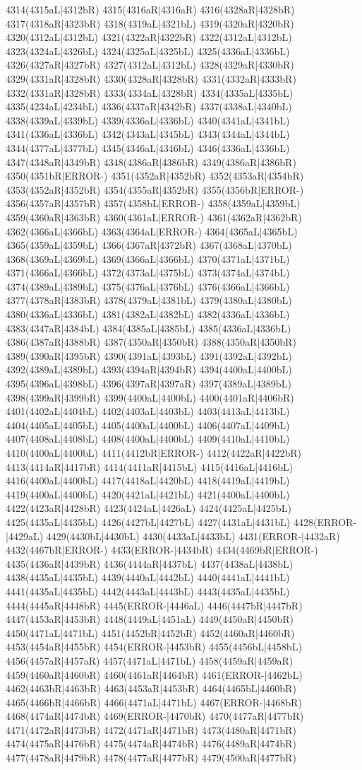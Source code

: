 4314(4315aL|4312bR) 4315(4316aR|4316aR) 4316(4328aR|4328bR) 4317(4318aR|4323bR) 4318(4319aL|4321bL) 4319(4320aR|4320bR) 4320(4312aL|4312bL) 4321(4322aR|4322bR) 4322(4312aL|4312bL) 4323(4324aL|4326bL) 4324(4325aL|4325bL) 4325(4336aL|4336bL) 4326(4327aR|4327bR) 4327(4312aL|4312bL) 4328(4329aR|4330bR) 4329(4331aR|4328bR) 4330(4328aR|4328bR) 4331(4332aR|4333bR) 4332(4331aR|4328bR) 4333(4334aL|4328bR) 4334(4335aL|4335bL) 4335(4234aL|4234bL) 4336(4337aR|4342bR) 4337(4338aL|4340bL) 4338(4339aL|4339bL) 4339(4336aL|4336bL) 4340(4341aL|4341bL) 4341(4336aL|4336bL) 4342(4343aL|4345bL) 4343(4344aL|4344bL) 4344(4377aL|4377bL) 4345(4346aL|4346bL) 4346(4336aL|4336bL) 4347(4348aR|4349bR) 4348(4386aR|4386bR) 4349(4386aR|4386bR) 4350(4351bR|ERROR-) 4351(4352aR|4352bR) 4352(4353aR|4354bR) 4353(4352aR|4352bR) 4354(4355aR|4352bR) 4355(4356bR|ERROR-) 4356(4357aR|4357bR) 4357(4358bL|ERROR-) 4358(4359aL|4359bL) 4359(4360aR|4363bR) 4360(4361aL|ERROR-) 4361(4362aR|4362bR) 4362(4366aL|4366bL) 4363(4364aL|ERROR-) 4364(4365aL|4365bL) 4365(4359aL|4359bL) 4366(4367aR|4372bR) 4367(4368aL|4370bL) 4368(4369aL|4369bL) 4369(4366aL|4366bL) 4370(4371aL|4371bL) 4371(4366aL|4366bL) 4372(4373aL|4375bL) 4373(4374aL|4374bL) 4374(4389aL|4389bL) 4375(4376aL|4376bL) 4376(4366aL|4366bL) 4377(4378aR|4383bR) 4378(4379aL|4381bL) 4379(4380aL|4380bL) 4380(4336aL|4336bL) 4381(4382aL|4382bL) 4382(4336aL|4336bL) 4383(4347aR|4384bL) 4384(4385aL|4385bL) 4385(4336aL|4336bL) 4386(4387aR|4388bR) 4387(4350aR|4350bR) 4388(4350aR|4350bR) 4389(4390aR|4395bR) 4390(4391aL|4393bL) 4391(4392aL|4392bL) 4392(4389aL|4389bL) 4393(4394aR|4394bR) 4394(4400aL|4400bL) 4395(4396aL|4398bL) 4396(4397aR|4397aR) 4397(4389aL|4389bL) 4398(4399aR|4399bR) 4399(4400aL|4400bL) 4400(4401aR|4406bR) 4401(4402aL|4404bL) 4402(4403aL|4403bL) 4403(4413aL|4413bL) 4404(4405aL|4405bL) 4405(4400aL|4400bL) 4406(4407aL|4409bL) 4407(4408aL|4408bL) 4408(4400aL|4400bL) 4409(4410aL|4410bL) 4410(4400aL|4400bL) 4411(4412bR|ERROR-) 4412(4422aR|4422bR) 4413(4414aR|4417bR) 4414(4411aR|4415bL) 4415(4416aL|4416bL) 4416(4400aL|4400bL) 4417(4418aL|4420bL) 4418(4419aL|4419bL) 4419(4400aL|4400bL) 4420(4421aL|4421bL) 4421(4400aL|4400bL) 4422(4423aR|4428bR) 4423(4424aL|4426aL) 4424(4425aL|4425bL) 4425(4435aL|4435bL) 4426(4427bL|4427bL) 4427(4431aL|4431bL) 4428(ERROR-|4429aL) 4429(4430bL|4430bL) 4430(4433aL|4433bL) 4431(ERROR-|4432aR) 4432(4467bR|ERROR-) 4433(ERROR-|4434bR) 4434(4469bR|ERROR-) 4435(4436aR|4439bR) 4436(4444aR|4437bL) 4437(4438aL|4438bL) 4438(4435aL|4435bL) 4439(4440aL|4442bL) 4440(4441aL|4441bL) 4441(4435aL|4435bL) 4442(4443aL|4443bL) 4443(4435aL|4435bL) 4444(4445aR|4448bR) 4445(ERROR-|4446aL) 4446(4447bR|4447bR) 4447(4453aR|4453bR) 4448(4449aL|4451aL) 4449(4450aR|4450bR) 4450(4471aL|4471bL) 4451(4452bR|4452bR) 4452(4460aR|4460bR) 4453(4454aR|4455bR) 4454(ERROR-|4453bR) 4455(4456bL|4458bL) 4456(4457aR|4457aR) 4457(4471aL|4471bL) 4458(4459aR|4459aR) 4459(4460aR|4460bR) 4460(4461aR|4464bR) 4461(ERROR-|4462bL) 4462(4463bR|4463bR) 4463(4453aR|4453bR) 4464(4465bL|4460bR) 4465(4466bR|4466bR) 4466(4471aL|4471bL) 4467(ERROR-|4468bR) 4468(4474aR|4474bR) 4469(ERROR-|4470bR) 4470(4477aR|4477bR) 4471(4472aR|4473bR) 4472(4471aR|4471bR) 4473(4480aR|4471bR) 4474(4475aR|4476bR) 4475(4474aR|4474bR) 4476(4489aR|4474bR) 4477(4478aR|4479bR) 4478(4477aR|4477bR) 4479(4500aR|4477bR) 